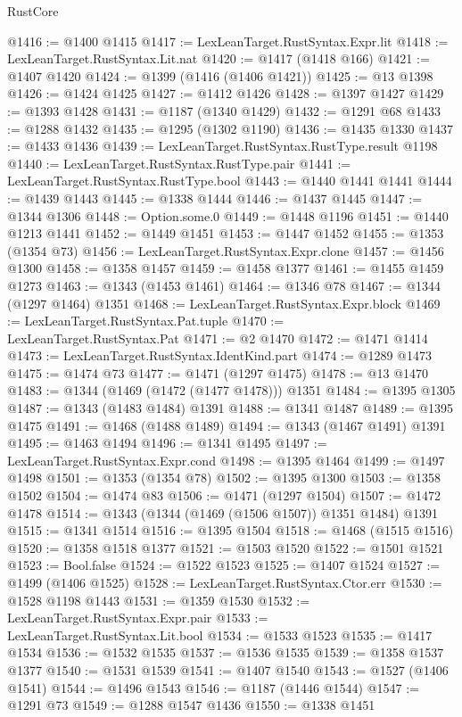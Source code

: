 \begin{lexlean}{RustCore}
\begin{coremodule}
@1416 := @1400 @1415
@1417 := LexLeanTarget.RustSyntax.Expr.lit
@1418 := LexLeanTarget.RustSyntax.Lit.nat
@1420 := @1417 (@1418 @166)
@1421 := @1407 @1420
@1424 := @1399 (@1416 (@1406 @1421))
@1425 := @13 @1398
@1426 := @1424 @1425
@1427 := @1412 @1426
@1428 := @1397 @1427
@1429 := @1393 @1428
@1431 := @1187 (@1340 @1429)
@1432 := @1291 @68
@1433 := @1288 @1432
@1435 := @1295 (@1302 @1190)
@1436 := @1435 @1330
@1437 := @1433 @1436
@1439 := LexLeanTarget.RustSyntax.RustType.result @1198
@1440 := LexLeanTarget.RustSyntax.RustType.pair
@1441 := LexLeanTarget.RustSyntax.RustType.bool
@1443 := @1440 @1441 @1441
@1444 := @1439 @1443
@1445 := @1338 @1444
@1446 := @1437 @1445
@1447 := @1344 @1306
@1448 := Option.some.{0}
@1449 := @1448 @1196
@1451 := @1440 @1213 @1441
@1452 := @1449 @1451
@1453 := @1447 @1452
@1455 := @1353 (@1354 @73)
@1456 := LexLeanTarget.RustSyntax.Expr.clone
@1457 := @1456 @1300
@1458 := @1358 @1457
@1459 := @1458 @1377
@1461 := @1455 @1459 @1273
@1463 := @1343 (@1453 @1461)
@1464 := @1346 @78
@1467 := @1344 (@1297 @1464) @1351
@1468 := LexLeanTarget.RustSyntax.Expr.block
@1469 := LexLeanTarget.RustSyntax.Pat.tuple
@1470 := LexLeanTarget.RustSyntax.Pat
@1471 := @2 @1470
@1472 := @1471 @1414
@1473 := LexLeanTarget.RustSyntax.IdentKind.part
@1474 := @1289 @1473
@1475 := @1474 @73
@1477 := @1471 (@1297 @1475)
@1478 := @13 @1470
@1483 := @1344 (@1469 (@1472 (@1477 @1478))) @1351
@1484 := @1395 @1305
@1487 := @1343 (@1483 @1484) @1391
@1488 := @1341 @1487
@1489 := @1395 @1475
@1491 := @1468 (@1488 @1489)
@1494 := @1343 (@1467 @1491) @1391
@1495 := @1463 @1494
@1496 := @1341 @1495
@1497 := LexLeanTarget.RustSyntax.Expr.cond
@1498 := @1395 @1464
@1499 := @1497 @1498
@1501 := @1353 (@1354 @78)
@1502 := @1395 @1300
@1503 := @1358 @1502
@1504 := @1474 @83
@1506 := @1471 (@1297 @1504)
@1507 := @1472 @1478
@1514 := @1343 (@1344 (@1469 (@1506 @1507)) @1351 @1484) @1391
@1515 := @1341 @1514
@1516 := @1395 @1504
@1518 := @1468 (@1515 @1516)
@1520 := @1358 @1518 @1377
@1521 := @1503 @1520
@1522 := @1501 @1521
@1523 := Bool.false
@1524 := @1522 @1523
@1525 := @1407 @1524
@1527 := @1499 (@1406 @1525)
@1528 := LexLeanTarget.RustSyntax.Ctor.err
@1530 := @1528 @1198 @1443
@1531 := @1359 @1530
@1532 := LexLeanTarget.RustSyntax.Expr.pair
@1533 := LexLeanTarget.RustSyntax.Lit.bool
@1534 := @1533 @1523
@1535 := @1417 @1534
@1536 := @1532 @1535
@1537 := @1536 @1535
@1539 := @1358 @1537 @1377
@1540 := @1531 @1539
@1541 := @1407 @1540
@1543 := @1527 (@1406 @1541)
@1544 := @1496 @1543
@1546 := @1187 (@1446 @1544)
@1547 := @1291 @73
@1549 := @1288 @1547 @1436
@1550 := @1338 @1451

\end{coremodule}
\end{lexlean}
